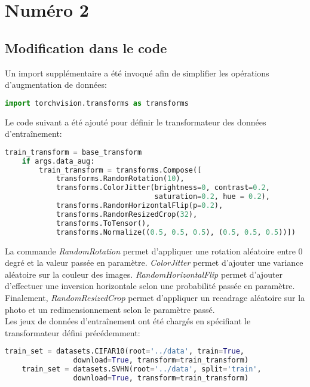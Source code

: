 \section{Numéro 2}

\subsection{Modification dans le code}
    Un import supplémentaire a été invoqué afin de simplifier les opérations d'augmentation de données:\\
    
    \begin{lstlisting}[language=python]
    import torchvision.transforms as transforms
    \end{lstlisting}
    
    Le code suivant a été ajouté pour définir le transformateur des données d'entraînement: \\
    
    \begin{lstlisting}[language=python]
    train_transform = base_transform
    if args.data_aug:
        train_transform = transforms.Compose([
            transforms.RandomRotation(10),
            transforms.ColorJitter(brightness=0, contrast=0.2, 
                                   saturation=0.2, hue = 0.2),
            transforms.RandomHorizontalFlip(p=0.2),
            transforms.RandomResizedCrop(32),
            transforms.ToTensor(),
            transforms.Normalize((0.5, 0.5, 0.5), (0.5, 0.5, 0.5))])
    \end{lstlisting}
    
    La commande \textit{RandomRotation} permet d'appliquer une rotation aléatoire entre 0 degré et la valeur passée en paramètre. \textit{ColorJitter} permet d'ajouter une variance aléatoire sur la couleur des images. \textit{RandomHorizontalFlip} permet d'ajouter d'effectuer une inversion horizontale selon une probabilité passée en paramètre. Finalement, \textit{RandomResizedCrop} permet d'appliquer un recadrage aléatoire sur la photo et un redimensionnement selon le paramètre passé.\\
    
    Les jeux de données d'entraînement ont été chargés en spécifiant le transformateur défini précédemment:    
    \begin{lstlisting}[language=python]
    train_set = datasets.CIFAR10(root='../data', train=True, 
                download=True, transform=train_transform)
    train_set = datasets.SVHN(root='../data', split='train',
                download=True, transform=train_transform)        
    \end{lstlisting}
    
